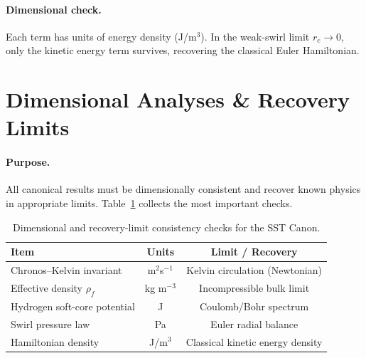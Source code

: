 \documentclass[reprint,aps,onecolumn,nofootinbib]{revtex4-2}
\begin{document}
    \paragraph{Dimensional check.}
        Each term has units of energy density (J/m$^3$). In the weak-swirl limit $r_c \to 0$,
        only the kinetic energy term survives, recovering the classical Euler Hamiltonian.

    \section{Dimensional Analyses \& Recovery Limits}
    \label{canon58:appB}
    \paragraph{Purpose.}
        All canonical results must be dimensionally consistent and recover
        known physics in appropriate limits. Table~\ref{canon58:dim-checks}
        collects the most important checks.
        \begin{table}[h!]
        \centering
        \begin{tabular}{|l|c|c|}
        \hline
        \textbf{Item} & \textbf{Units} & \textbf{Limit / Recovery} \\
        \hline
        Chronos--Kelvin invariant & m$^{2}$s$^{-1}$ & Kelvin circulation (Newtonian) \\
        Effective density $\rho_{\!f}$ & kg m$^{-3}$ & Incompressible bulk limit \\
        Hydrogen soft-core potential & J & Coulomb/Bohr spectrum \\
        Swirl pressure law & Pa & Euler radial balance \\
        Hamiltonian density & J/m$^{3}$ & Classical kinetic energy density \\
        \hline
        \end{tabular}
        \caption{Dimensional and recovery-limit consistency checks for the SST Canon.}
        \label{canon58:dim-checks}
        \end{table}

\end{document}
